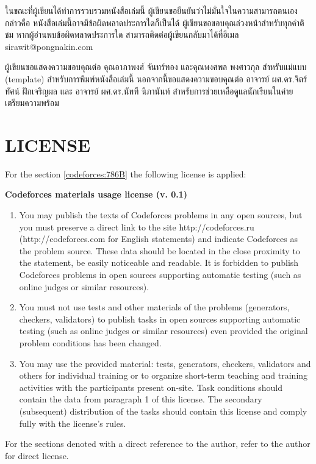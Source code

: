 \documentclass[12pt]{octavo}
\begin{document}
ในขณะที่ผู้เขียนได้ทำการรวบรวมหนังสือเล่มนี้ ผู้เขียนขอยืนยันว่าไม่มั่นใจในความสามารถตนเอง กล่าวคือ หนังสือเล่มนี้อาจมีข้อผิดพลาดประการใดก็เป็นได้ ผู้เขียนขอขอบคุณล่วงหน้าสำหรับทุกคำติชม หากผู้อ่านพบข้อผิดพลาดประการใด สามารถติดต่อผู้เขียนกลับมาได้ที่อีเมล sirawit@pongnakin.com

ผู้เขียนขอแสดงความขอบคุณต่อ คุณอาภาพงศ์ จันทร์ทอง และคุณพงศพล พงศาวกุล สำหรับแม่แบบ (template) สำหรับการพิมพ์หนังสือเล่มนี้ นอกจากนี้ขอแสดงความขอบคุณต่อ อาจารย์ ผศ.ดร.จิตร์ทัศน์ ฝักเจริญผล และ อาจารย์ ผศ.ดร.นัทที นิภานันท์ สำหรับการช่วยเหลือดูแลนักเรียนในค่ายเตรียมความพร้อม

\chapter*{LICENSE}

For the section \ref{codeforces:786B} the following license is applied:
\begin{center}
\textbf{Codeforces materials usage license (v. 0.1)}    
\end{center}
\begin{enumerate}
    \item You may publish the texts of Codeforces problems in any open sources, but you must preserve a direct link to the site http://codeforces.ru (http://codeforces.com for English statements) and indicate Codeforces as the problem source. These data should be located in the close proximity to the statement, be easily noticeable and readable. It is forbidden to publish Codeforces problems in open sources supporting automatic testing (such as online judges or similar resources).
    \item You must not use tests and other materials of the problems (generators, checkers, validators) to publish tasks in open sources supporting automatic testing (such as online judges or similar resources) even provided the original problem conditions has been changed.
    \item You may use the provided material: tests, generators, checkers, validators and others for individual training or to organize short-term teaching and training activities with the participants present on-site. Task conditions should contain the data from paragraph 1 of this license. The secondary (subsequent) distribution of the tasks should contain this license and comply fully with the license’s rules.
\end{enumerate}

For the sections denoted with a direct reference to the author, refer to the author for direct license.
\end{document}
